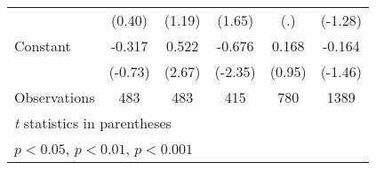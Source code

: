 {\begin{tabular}{l*{5}{c}}
                &   (0.40)         &   (1.19)         &   (1.65)         &      (.)         &  (-1.28)         \\
[1em]
Constant        &   -0.317         &    0.522\sym{**} &   -0.676\sym{*}  &    0.168         &   -0.164         \\
                &  (-0.73)         &   (2.67)         &  (-2.35)         &   (0.95)         &  (-1.46)         \\
\hline
Observations    &      483         &      483         &      415         &      780         &     1389         \\
\hline\hline
\multicolumn{6}{l}{\footnotesize \textit{t} statistics in parentheses}\\
\multicolumn{6}{l}{\footnotesize \sym{*} \(p<0.05\), \sym{**} \(p<0.01\), \sym{***} \(p<0.001\)}\\
\end{tabular}
}
